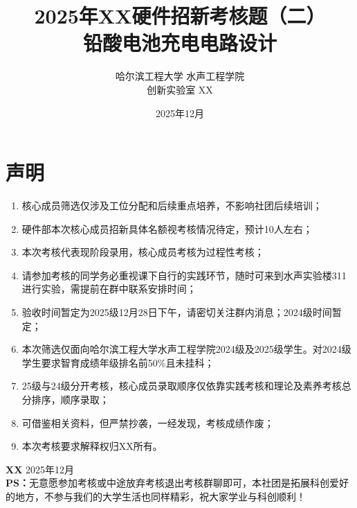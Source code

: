 \documentclass[lang=cn,a4paper,11pt]{elegantpaper}
\title{2025年XX硬件招新考核题（二）\\铅酸电池充电电路设计}
\author{哈尔滨工程大学 水声工程学院\\创新实验室 XX}
\institute{水声工程学院创新实验室}
\date{2025年12月} %
\begin{document}
\maketitle









\section{声明}
\begin{enumerate}
    \item 核心成员筛选仅涉及工位分配和后续重点培养，不影响社团后续培训；
    \item 硬件部本次核心成员招新具体名额视考核情况待定，预计10人左右；
    \item 本次考核代表现阶段录用，核心成员考核为过程性考核；
    \item 请参加考核的同学务必重视课下自行的实践环节，随时可来到水声实验楼311进行实验，需提前在群中联系安排时间；
    \item 验收时间暂定为2025级12月28日下午，请密切关注群内消息；2024级时间暂定；
    \item 本次筛选仅面向哈尔滨工程大学水声工程学院2024级及2025级学生。对2024级学生要求智育成绩年级排名前50\%且未挂科；
    \item 25级与24级分开考核，核心成员录取顺序仅依靠实践考核和理论及素养考核总分排序，顺序录取；
    \item 可借鉴相关资料，但严禁抄袭，一经发现，考核成绩作废；
    \item 本次考核要求解释权归XX所有。
\end{enumerate}

\vspace{2em}
\noindent\textbf{XX} \hfill 2025年12月\\
\vspace{1em}
\noindent\textbf{PS：}无意愿参加考核或中途放弃考核退出考核群聊即可，本社团是拓展科创爱好的地方，不参与我们的大学生活也同样精彩，祝大家学业与科创顺利！
\end{document}
